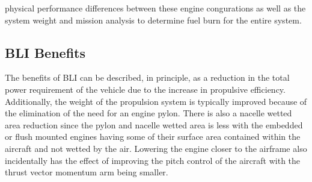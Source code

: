 \documentclass[12pt]{gatech-thesis}
\begin{document}
physical performance differences between these engine congurations as well as the system weight and mission analysis to determine fuel burn for the entire system.

\subsection{BLI Benefits}
The benefits of BLI can be described, in principle, as a reduction in the total power requirement of the vehicle due to the increase in propulsive efficiency.  Additionally, the weight of the propulsion system is typically improved because of the elimination of the need for an engine pylon. There is also a nacelle wetted area reduction since the pylon and nacelle wetted area is less with the embedded or flush mounted engines having some of their surface area contained within the aircraft and not wetted by the air.  Lowering the engine closer to the airframe also incidentally has the effect of improving the pitch control of the aircraft with the thrust vector momentum arm being smaller.  
\end{document}
